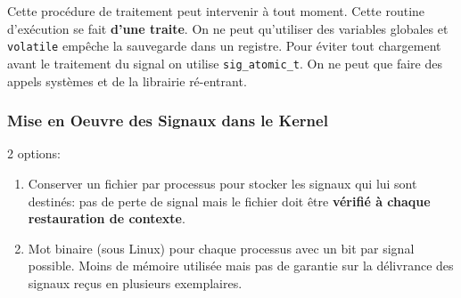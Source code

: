 Cette procédure de traitement peut intervenir à tout moment. Cette
routine d'exécution se fait \textbf{d'une traite}. On ne peut
qu'utiliser des variables globales et \texttt{volatile} empêche la
sauvegarde dans un registre. Pour éviter tout chargement avant le
traitement du signal on utilise \texttt{sig\_atomic\_t}. On ne peut que
faire des appels systèmes et de la librairie ré-entrant.

\subsubsection{Mise en Oeuvre des Signaux dans le
Kernel}\label{mise-en-oeuvre-des-signaux-dans-le-kernel}

2 options:

\begin{enumerate}
\def\labelenumi{\arabic{enumi}.}
\tightlist
\item
  Conserver un fichier par processus pour stocker les signaux qui lui
  sont destinés: pas de perte de signal mais le fichier doit être
  \textbf{vérifié à chaque restauration de contexte}.
\item
  Mot binaire (sous Linux) pour chaque processus avec un bit par signal
  possible. Moins de mémoire utilisée mais pas de garantie sur la
  délivrance des signaux reçus en plusieurs exemplaires.
\end{enumerate}
